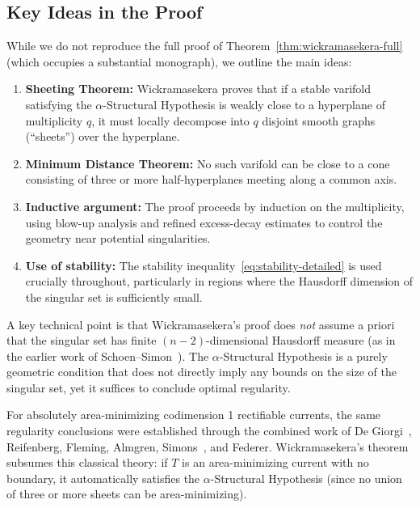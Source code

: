 \subsection{Key Ideas in the Proof}

While we do not reproduce the full proof of Theorem~\ref{thm:wickramasekera-full} (which occupies
a substantial monograph), we outline the main ideas:

\begin{enumerate}
\item \textbf{Sheeting Theorem:} Wickramasekera proves that if a stable varifold satisfying the
$\alpha$-Structural Hypothesis is weakly close to a hyperplane of multiplicity $q$, it must locally
decompose into $q$ disjoint smooth graphs (``sheets'') over the hyperplane.

\item \textbf{Minimum Distance Theorem:} No such varifold can be close to a cone consisting of
three or more half-hyperplanes meeting along a common axis.

\item \textbf{Inductive argument:} The proof proceeds by induction on the multiplicity, using blow-up
analysis and refined excess-decay estimates to control the geometry near potential singularities.

\item \textbf{Use of stability:} The stability inequality~\eqref{eq:stability-detailed} is used
crucially throughout, particularly in regions where the Hausdorff dimension of the singular set
is sufficiently small.
\end{enumerate}

A key technical point is that Wickramasekera's proof does \emph{not} assume a priori that the
singular set has finite $(n-2)$-dimensional Hausdorff measure (as in the earlier work of
Schoen--Simon~\cite{SS}). The $\alpha$-Structural Hypothesis is a purely geometric condition that
does not directly imply any bounds on the size of the singular set, yet it suffices to conclude
optimal regularity.

\begin{remark}
For absolutely area-minimizing codimension 1 rectifiable currents, the same regularity conclusions
were established through the combined work of De Giorgi~\cite{DG}, Reifenberg, Fleming, Almgren,
Simons~\cite{SJ}, and Federer. Wickramasekera's theorem subsumes this classical theory: if $T$ is
an area-minimizing current with no boundary, it automatically satisfies the $\alpha$-Structural
Hypothesis (since no union of three or more sheets can be area-minimizing).
\end{remark}
